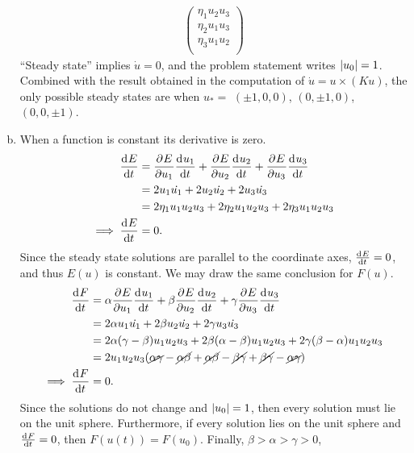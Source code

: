 \documentclass[12pt]{article}
\begin{document}
\begin{enumerate}[(a)]
\begin{equation*}
\begin{aligned}
\begin{pmatrix}
        \eta_1u_2u_3 \\
        \eta_2u_1u_3 \\
        \eta_3u_1u_2 \\
      \end{pmatrix}
    \end{aligned}
  \end{equation*}
  ``Steady state'' implies $\dot{u}=0$, and the problem statement writes
  $\left|{u_0}\right|=1$. Combined with the result obtained in the computation of
  $\dot{u}=u\times(Ku)$, the only possible steady states are when $u_*=$
  $(\pm1,0,0)$, $(0,\pm1,0)$, $(0,0,\pm1)$.
\item When a function is constant its derivative is zero.
  \begin{equation*}
    \begin{aligned}
      \frac{\mathrm{d}^{} {E}}{\mathrm{d}{t}^{}} &= \frac{\partial^{} {E}}{\partial {u_1}^{}}\frac{\mathrm{d}^{} {u_1}}{\mathrm{d}{t}^{}} + \frac{\partial^{} {E}}{\partial {u_2}^{}}\frac{\mathrm{d}^{} {u_2}}{\mathrm{d}{t}^{}} + \frac{\partial^{} {E}}{\partial {u_3}^{}}\frac{\mathrm{d}^{} {u_3}}{\mathrm{d}{t}^{}} \\
      &= 2u_1\dot{u_1} + 2u_2\dot{u_2} + 2u_3\dot{u_3} \\
      &= 2\eta_1u_1u_2u_3 + 2\eta_2u_1u_2u_3 + 2\eta_3u_1u_2u_3 \\
      \implies \frac{\mathrm{d}^{} {E}}{\mathrm{d}{t}^{}}&= 0.
    \end{aligned}
  \end{equation*}
  Since the steady state solutions are parallel to the coordinate axes,
  $\frac{\mathrm{d}^{} {E}}{\mathrm{d}{t}^{}}=0$, and thus $E(u)$ is constant. We may draw the same conclusion
  for $F(u)$.
  \begin{equation*}
    \begin{aligned}
      \frac{\mathrm{d}^{} {F}}{\mathrm{d}{t}^{}} &= \alpha\frac{\partial^{} {E}}{\partial {u_1}^{}}\frac{\mathrm{d}^{} {u_1}}{\mathrm{d}{t}^{}} + \beta\frac{\partial^{} {E}}{\partial {u_2}^{}}\frac{\mathrm{d}^{} {u_2}}{\mathrm{d}{t}^{}} + \gamma\frac{\partial^{} {E}}{\partial {u_3}^{}}\frac{\mathrm{d}^{} {u_3}}{\mathrm{d}{t}^{}} \\
      &= 2\alpha u_1\dot{u_1} + 2\beta u_2\dot{u_2} + 2\gamma u_3\dot{u_3} \\
      &= 2\alpha(\gamma-\beta)u_1u_2u_3 + 2\beta(\alpha-\beta)u_1u_2u_3 + 2\gamma(\beta-\alpha)u_1u_2u_3 \\
      &= 2u_1u_2u_3 (\cancel{\alpha\gamma}-\cancel{\alpha\beta}+\cancel{\alpha\beta}-\cancel{\beta\gamma}+
      \cancel{\beta\gamma}-\cancel{\alpha\gamma}) \\
      \implies \frac{\mathrm{d}^{} {F}}{\mathrm{d}{t}^{}} &= 0.
    \end{aligned}
  \end{equation*}
  Since the solutions do not change and $\left|{u_0}\right|=1$, then every solution must
  lie on the unit sphere. Furthermore, if every solution lies on the unit sphere
  and $\frac{\mathrm{d}^{} {F}}{\mathrm{d}{t}^{}}=0$, then $F(u(t))=F(u_0)$. Finally, $\beta>\alpha>\gamma>0$,

\end{enumerate}
\end{document}
